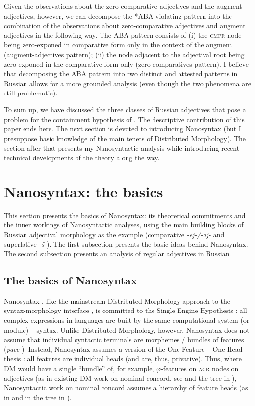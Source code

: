 \documentclass[output=paper,colorlinks,citecolor=brown]{langscibook}
\begin{document}
\largerpage
Given the observations about the zero-comparative adjectives and the augment adjectives, however, we can decompose the *ABA-violating pattern into the combination of the observations about zero-comparative adjectives and augment adjectives in the following way. The ABA pattern consists of (i) the \textsc{cmpr} node being zero-exponed in comparative form only in the context of the augment (augment-adjectives pattern); (ii) the node adjacent to the adjectival root being zero-exponed in the comparative form only (zero-comparatives pattern). I believe that decomposing the ABA pattern into two distinct and attested patterns in Russian allows for a more grounded analysis (even though the two phenomena are still problematic).

To sum up, we have discussed the three classes of Russian adjectives that pose a problem for the containment hypothesis of \citet{Bobaljik:2012}. The descriptive contribution of this paper ends here. The next section is devoted to introducing Nanosyntax (but I presuppose basic knowledge of the main tenets of Distributed Morphology). The section after that presents my Nanosyntactic analysis while introducing recent technical developments of the theory along the way.

\section{Nanosyntax: the basics}\label{kas:sec:nano}

This section presents the basics of Nanosyntax: its theoretical commitments and the inner workings of Nanosyntactic analyses, using the main building blocks of Russian adjectival morphology as the example (comparative \textit{-ej-/-aj-} and superlative \textit{-š-}). The first subsection presents the basic ideas behind Nanosyntax. The second subsection presents an analysis of regular adjectives in Russian.

\subsection{The basics of Nanosyntax}

Nanosyntax \citep{Starke:2009,Baunaz:2018}, like the mainstream Distributed Morphology approach to the syntax-morphology interface \citep{Halle:1994}, is committed to the Single Engine Hypothesis \citep{Marantz:2001}: all complex expressions in languages are built by the same computational system (or module) -- syntax.  Unlike Distributed Morphology, however, Nanosyntax does not assume that individual syntactic terminals are morphemes / bundles of features (\textit{pace} \citealt{Embick:2015}). Instead, Nanosyntax assumes a version of the One Feature -- One Head thesis \citep{Kayne:2005}: all features are individual heads (and are, thus, privative). Thus, where DM would have a single ``bundle'' of, for example, $\varphi$-features on \textsc{agr} nodes on adjectives (as in existing DM work on nominal concord, see \citealt{Norris:2014} and the tree in ), Nanosyntactic work on nominal concord assumes a hierarchy of feature heads (as in \citealt{Caha:2023b} and in the tree in ).
\end{document}
